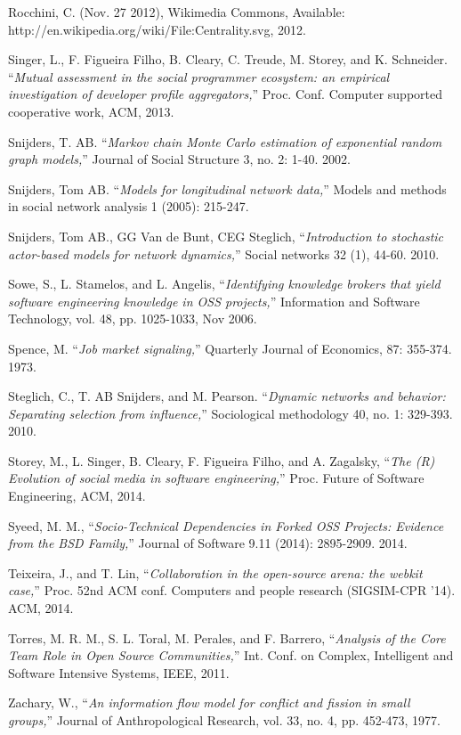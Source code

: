 \begin{thebibliography}{99.}
 Rocchini, C. (Nov. 27 2012), Wikimedia Commons, Available:\\ http://en.wikipedia.org/wiki/File:Centrality.svg, 2012.  

 Singer, L., F. Figueira Filho, B. Cleary, C. Treude, M. Storey, and K. Schneider. ``\textit{Mutual assessment in the social programmer ecosystem: an empirical investigation of developer profile aggregators,}'' Proc. Conf. Computer supported cooperative work, ACM, 2013.

 Snijders, T. AB. ``\textit{Markov chain Monte Carlo estimation of exponential random graph models,}'' Journal of Social Structure 3, no. 2: 1-40. 2002.

 Snijders, Tom AB. ``\textit{Models for longitudinal network data,}'' Models and methods in social network analysis 1 (2005): 215-247. 

 Snijders, Tom AB., GG Van de Bunt, CEG Steglich, ``\textit{Introduction to stochastic actor-based models for network dynamics,}'' Social networks 32 (1), 44-60. 2010.

 Sowe, S., L. Stamelos, and L. Angelis, ``\textit{Identifying knowledge brokers that yield software engineering knowledge in OSS projects,}'' Information and Software Technology, vol. 48, pp. 1025-1033, Nov 2006. 

 Spence, M. ``\textit{Job market signaling,}'' Quarterly Journal of Economics, 87: 355-374. 1973.

 Steglich, C., T. AB Snijders, and M. Pearson. ``\textit{Dynamic networks and behavior: Separating selection from influence,}'' Sociological methodology 40, no. 1: 329-393. 2010.

 Storey, M., L. Singer, B. Cleary, F. Figueira Filho, and A. Zagalsky, ``\textit{The (R) Evolution of social media in software engineering,}'' Proc. Future of Software Engineering, ACM, 2014.

 Syeed, M. M., ``\textit{Socio-Technical Dependencies in Forked OSS Projects: Evidence from the BSD Family,}'' Journal of Software 9.11 (2014): 2895-2909. 2014.

 Teixeira, J., and T. Lin, ``\textit{Collaboration in the open-source arena: the webkit case,}'' Proc. 52nd ACM conf. Computers and people research (SIGSIM-CPR '14). ACM, 2014.

 Torres, M. R. M., S. L. Toral, M. Perales, and F. Barrero, ``\textit{Analysis of the Core Team Role in Open Source Communities,}'' Int. Conf. on Complex, Intelligent and Software Intensive Systems, IEEE, 2011. 

 Zachary, W., ``\textit{An information flow model for conflict and fission in small groups,}'' Journal of Anthropological Research, vol. 33, no. 4, pp. 452-473, 1977.

\end{thebibliography}

